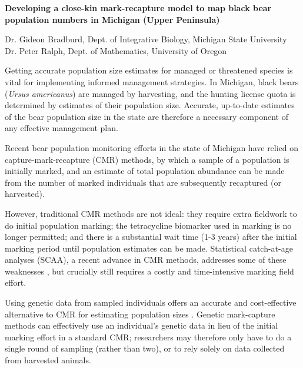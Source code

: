 \documentclass[11pt]{article}
\begin{document}
%
\begin{center}
\textbf{Developing a close-kin mark-recapture model to map black bear population numbers in Michigan (Upper Peninsula)}
\end{center}
%            
\vspace{0.5em}

\noindent Dr. Gideon Bradburd, Dept. of Integrative Biology, Michigan State University\\
\noindent Dr. Peter Ralph, Dept. of Mathematics, University of Oregon

\vspace{1em}

\noindent Getting accurate population size estimates 
for managed or threatened species  
is vital for implementing informed management strategies.
In Michigan, black bears (\textit{Ursus americanus}) 
are managed by harvesting, 
and the hunting license quota is determined by 
estimates of their population size.
Accurate, up-to-date estimates of 
the bear population size in the state 
are therefore a necessary component 
of any effective management plan.

Recent bear population monitoring efforts 
in the state of Michigan have relied on 
capture-mark-recapture (CMR) methods, 
by which a sample of a population is initially marked, 
and an estimate of total population abundance 
can be made from the number of marked individuals 
that are subsequently recaptured (or harvested). 

However, traditional CMR methods are not ideal:  
they require extra fieldwork to do initial population marking; 
the tetracycline biomarker used in marking is no longer permitted; 
and there is a substantial wait time (1-3 years) after the 
initial marking period until population estimates can be made.
Statistical catch-at-age analyses (SCAA), 
a recent advance in CMR methods, 
addresses some of these weaknesses \citep{mayhew2019}, 
but crucially still requires a costly and time-intensive 
marking field effort.

Using genetic data from sampled individuals 
offers an accurate and cost-effective alternative to CMR 
for estimating population sizes \citep{Skaug2001,Hettiarachchige2018}. 
Genetic mark-capture methods can effectively use 
an individual's genetic data in lieu of 
the initial marking effort in a standard CMR; 
researchers may therefore 
only have to do a single round of sampling 
(rather than two), 
or to rely solely on data collected from harvested animals.
\end{document}
